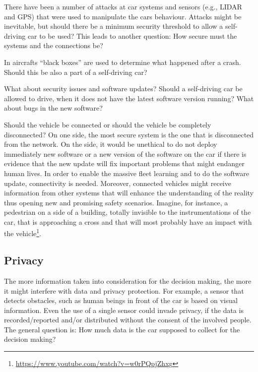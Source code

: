 There have been a number of attacks at car systems and sensors (e.g., LIDAR and GPS) that were used to manipulate the cars behaviour. Attacks might be inevitable, but should there be a minimum security threshold to allow a self-driving car to be used? This leads to another question: How secure must the systems and the connections be? 

In aircrafts \enquote{black boxes} are used to determine what happened after a crash. Should this be also a part of a self-driving car? 

What about security issues and software updates? Should a self-driving car be allowed to drive, when it does not have the latest software version running? What about bugs in the new software?

Should the vehicle be connected or should the vehicle be completely disconnected? On one side, the most secure system is the one that is disconnected from the network. On the side, it would be unethical to do not deploy immediately new software or a new version of the software on the car if there is evidence that the new update will fix important problems that might endanger human lives. 
In order to enable the massive fleet learning and to do the software update, connectivity is needed. Moreover, connected vehicles might receive information from other systems that will enhance the understanding of the reality thus opening new and promising safety scenarios. Imagine, for instance, a pedestrian on a side of a building, totally invisible to the instrumentations of the car, that is approaching a cross and that will most probably have an impact with the vehicle\footnote{\url{https://www.youtube.com/watch?v=w0rPQpjZhxg}}. 


\subsection{Privacy}
\label{sec:EAofTC:Privacy}

The more information taken into consideration for the decision making, the more it might interfere with data and privacy protection. For example, a sensor that detects obstacles, such as human beings in front of the car is based on visual information. Even the use of a single sensor could invade privacy, if the data is recorded/reported and/or distributed without the consent of the involved people. The general question is: How much data is the car supposed to collect for the decision making?  

